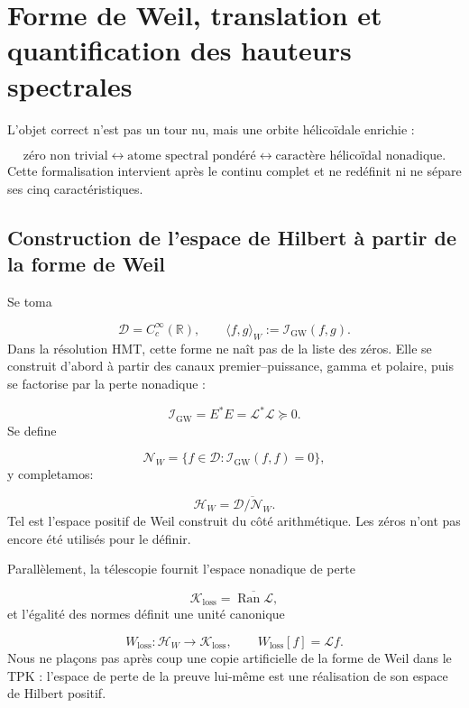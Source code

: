 \section{Forme de Weil, translation et quantification des hauteurs spectrales}
L'objet correct n'est pas un tour nu, mais une orbite hélicoïdale enrichie :\par
\[
\boxed{
\text{zéro non trivial}
\longleftrightarrow
\text{atome spectral pondéré}
\longleftrightarrow
\text{caractère hélicoïdal nonadique}.
}
\]
Cette formalisation intervient après le continu complet et ne redéfinit ni ne sépare ses cinq caractéristiques.\par
{}
\subsection{Construction de l'espace de Hilbert à partir de la forme de Weil}
Se toma\par
\[
\mathcal D=C_c^\infty(\mathbb R),
\qquad
\langle f,g\rangle_W
:=
\mathscr I_{\mathrm{GW}}(f,g).
\]
Dans la résolution HMT, cette forme ne naît pas de la liste des zéros. Elle se construit d'abord à partir des canaux premier–puissance, gamma et polaire, puis se factorise par la perte nonadique :\par
\[
\mathscr I_{\mathrm{GW}}
=
E^*E
=
\mathscr L^*\mathscr L
\succeq0.
\]
Se define\par
\[
\mathcal N_W
=
\{f\in\mathcal D:
\mathscr I_{\mathrm{GW}}(f,f)=0\},
\]
y completamos:\par
\[
\mathcal H_W
=
\overline{\mathcal D/\mathcal N_W}.
\]
Tel est l'espace positif de Weil construit du côté arithmétique. Les zéros n'ont pas encore été utilisés pour le définir.\par
Parallèlement, la télescopie fournit l'espace nonadique de perte\par
\[
\mathcal K_{\mathrm{loss}}
=
\overline{\operatorname{Ran}\mathscr L},
\]
et l'égalité des normes définit une unité canonique\par
\[
W_{\mathrm{loss}}:
\mathcal H_W
\longrightarrow
\mathcal K_{\mathrm{loss}},
\qquad
W_{\mathrm{loss}}[f]=\mathscr Lf.
\]
Nous ne plaçons pas après coup une copie artificielle de la forme de Weil dans le TPK : l'espace de perte de la preuve lui-même est une réalisation de son espace de Hilbert positif.\par
{}
